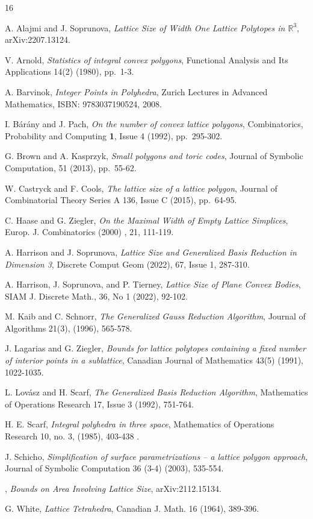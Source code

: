 \documentclass[11pt]{amsart}
\numberwithin{equation}{section}
\theoremstyle{plain}
\theoremstyle{definition}
\newcommand{\R}{\mathbb R}
\begin{document}
\begin{thebibliography}{16}


 {\sc A. Alajmi and J. Soprunova}, {\em Lattice Size of Width One Lattice Polytopes in $\R^3$}, arXiv:2207.13124.

 {\sc V. Arnold}, {\em Statistics of integral convex polygons}, Functional Analysis and Its
Applications 14(2) (1980), pp.~1-3. 


 {\sc A. Barvinok}, {\em Integer Points in Polyhedra}, Zurich Lectures in Advanced Mathematics, ISBN: 9783037190524, 2008.


 {\sc I. B\'ar\'any and J. Pach}, {\em On the number of convex lattice polygons},  Combinatorics,
Probability and Computing {\bf 1}, Issue 4 (1992), pp.~295-302.


 {\sc G. Brown and A.  Kasprzyk}, {\em Small polygons and toric codes}, Journal of Symbolic
Computation,  51 (2013),  pp.~55-62.


 {\sc W. Castryck  and F. Cools}, {\em The lattice size of a lattice polygon}, Journal of Combinatorial Theory Series A 136, Issue C  (2015), pp.~64-95.


 {\sc C. Haase and G. Ziegler}, {\em On the Maximal Width of Empty Lattice Simplices}, Europ. J. Combinatorics (2000) ,  21, 111-119.



 {\sc A. Harrison and J. Soprunova}, {\em Lattice Size and Generalized Basis Reduction in Dimension 3},  Discrete Comput Geom (2022), 67, Issue 1, 287-310.

 {\sc A. Harrison, J. Soprunova, and P. Tierney}, {\em Lattice Size of Plane Convex Bodies},  SIAM J. Discrete Math., 36, No 1 (2022), 92-102.

 {\sc M. Kaib and C. Schnorr}, {\em The Generalized Gauss Reduction Algorithm}, Journal of Algorithms
21(3), (1996), 565-578. 

 {\sc J. Lagarias and G. Ziegler}, {\em Bounds for lattice polytopes containing a fixed number of interior points in a sublattice}, Canadian Journal of Mathematics 43(5)
(1991), 1022-1035. 

 {\sc L. Lov\'asz and  H. Scarf}, {\em The Generalized Basis Reduction Algorithm}, Mathematics of Operations Research  17, Issue 3 (1992), 751-764.


 {\sc H. E. Scarf}, {\em Integral polyhedra in three space}, Mathematics of Operations Research 10, no.
3, (1985), 403-438 .

 {\sc J. Schicho}, {\em Simplification of surface parametrizations -- a lattice polygon approach}, Journal of Symbolic Computation  36 (3-4) (2003), 535-554.


, {\em Bounds on Area Involving Lattice Size}, arXiv:2112.15134.

 {\sc G. White}, {\em Lattice Tetrahedra}, Canadian J. Math. 16 (1964), 389-396.

\end{thebibliography}
\end{document}
